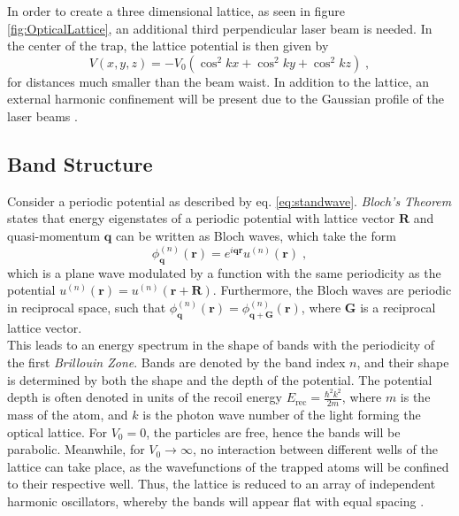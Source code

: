In order to create a three dimensional lattice, as seen in figure \ref{fig:OpticalLattice}, an additional third perpendicular laser beam is needed. In the center of the trap, the lattice potential is then given by
\begin{equation}
	V(x,y,z) = - V_0 \left( \cos^2{k x } + \cos^2{k y } + \cos^2{k z } \right) \; , \label{eq:3Dlattice}
\end{equation}
for distances much smaller than the beam waist. In addition to the lattice, an external harmonic confinement will be present due to the Gaussian profile of the laser beams \cite{manybodyBloch}.

\subsection{Band Structure}
Consider a periodic potential as described by eq. \eqref{eq:standwave}. \textit{Bloch's Theorem} states that energy eigenstates of a periodic potential with lattice vector $\boldsymbol{R}$ and quasi-momentum $\boldsymbol{q}$ can be written as Bloch waves, which take the form
\begin{equation}
	\phi_{\boldsymbol{q}}^{(n)}(\boldsymbol{r}) = e^{i \boldsymbol{q} \boldsymbol{r}} u^{(n)}(\boldsymbol{r}) \; ,
\end{equation}
which is a plane wave modulated by a function with the same periodicity as the potential $u^{(n)}(\boldsymbol{r}) = u^{(n)}(\boldsymbol{r} + \boldsymbol{R})$. Furthermore, the Bloch waves are periodic in reciprocal space, such that $\phi_{\boldsymbol{q}}^{(n)}(\boldsymbol{r}) = \phi_{\boldsymbol{q} + \boldsymbol{G}}^{(n)}(\boldsymbol{r})$, where $\boldsymbol{G}$ is a reciprocal lattice vector. \cite{kittel} \\
This leads to an energy spectrum in the shape of bands with the periodicity of the first \textit{Brillouin Zone}. Bands are denoted by the band index $n$, and their shape is determined by both the shape and the depth of the potential. The potential depth is often denoted in units of the recoil energy $E_{\mathrm{rec}} = \frac{\hbar ^2 k^2}{2 m}$, where $m$ is the mass of the atom, and $k$ is the photon wave number of the light forming the optical lattice. For $V_0 = 0$, the particles are free, hence the bands will be parabolic. Meanwhile, for $V_0 \rightarrow \infty$, no interaction between different wells of the lattice can take place, as the wavefunctions of the trapped atoms will be confined to their respective well. Thus, the lattice is reduced to an array of independent harmonic oscillators, whereby the bands will appear flat with equal spacing \cite{greiner}. 

